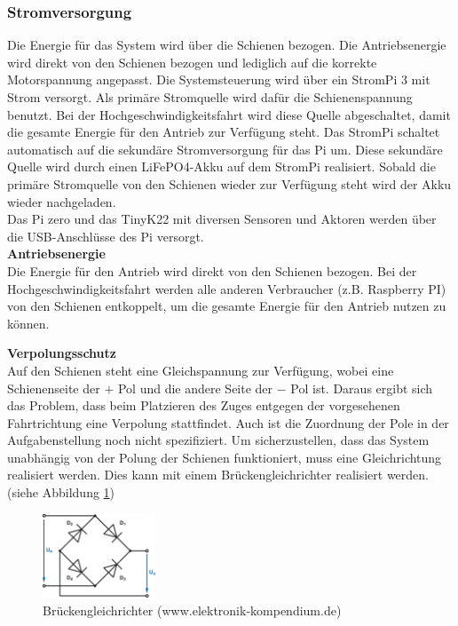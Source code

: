 \documentclass[../../main.tex]{subfiles}
\begin{document}
    \subsubsection{Stromversorgung} \label{et_stromversorgung}
    Die Energie für das System wird über die Schienen bezogen. Die Antriebsenergie wird direkt von den Schienen bezogen und lediglich auf die korrekte Motorspannung angepasst. Die
    Systemsteuerung wird über ein StromPi 3 mit Strom versorgt. Als primäre Stromquelle wird dafür die Schienenspannung
    benutzt. Bei der Hochgeschwindigkeitsfahrt wird diese Quelle abgeschaltet, damit die gesamte Energie für den Antrieb
    zur Verfügung steht. Das StromPi schaltet automatisch auf die sekundäre Stromversorgung für das Pi um. Diese sekundäre
    Quelle wird durch einen LiFePO4-Akku auf dem StromPi realisiert. Sobald die primäre Stromquelle von den Schienen
    wieder zur Verfügung steht wird der Akku wieder nachgeladen.\\
    Das Pi zero und das TinyK22 mit diversen Sensoren und Aktoren werden über die USB-Anschlüsse des Pi versorgt.\\

    \textbf{Antriebsenergie}\\
    Die Energie für den Antrieb wird direkt von den Schienen bezogen. Bei der Hochgeschwindigkeitsfahrt werden alle anderen Verbraucher (z.B. Raspberry PI) von den Schienen entkoppelt, um die gesamte Energie für den Antrieb nutzen zu können.

    \textbf{Verpolungsschutz}\\
    Auf den Schienen steht eine Gleichspannung zur Verfügung, wobei eine Schienenseite der $+$ Pol und die andere Seite der $-$ Pol ist. Daraus ergibt sich das Problem, dass beim Platzieren des Zuges entgegen der vorgesehenen Fahrtrichtung eine Verpolung stattfindet. Auch ist die Zuordnung der Pole in der Aufgabenstellung noch nicht spezifiziert. Um sicherzustellen, dass das System unabhängig von der Polung der Schienen funktioniert, muss eine Gleichrichtung realisiert werden. Dies kann mit einem Brückengleichrichter realisiert werden. (siehe Abbildung \ref{fig:et_bruckengleichrichter})

    \begin{figure}[H]
        \centering
        \includegraphics[width=0.3\textwidth]{Brueckengleichrichter.png}
        \caption {Brückengleichrichter (www.elektronik-kompendium.de)}
        \label{fig:et_bruckengleichrichter}
    \end{figure}
\end{document}
